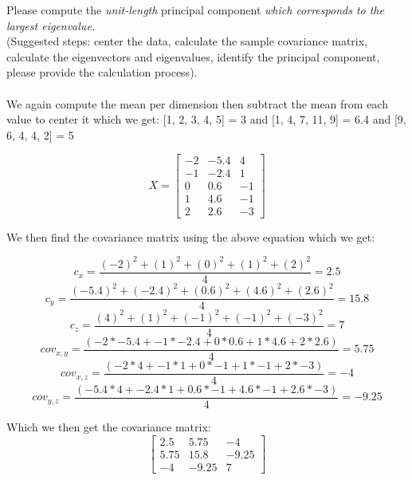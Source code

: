 \documentclass{article}
\begin{document}
\noindent
Please compute the \textit{unit-length} principal component \textit{which corresponds to the largest eigenvalue.}
\\
(Suggested steps: center the data, calculate the sample covariance matrix, calculate the eigenvectors and eigenvalues, identify the principal component, please provide the calculation process).
\\\\
We again compute the mean per dimension then subtract the mean from each value to center it which we get:
[1, 2, 3, 4, 5] = 3 and [1, 4, 7, 11, 9] = 6.4 and [9, 6, 4, 4, 2] = 5

\begin{equation*}
    X = \begin{bmatrix}
        -2  & -5.4  & 4 \\
        -1  & -2.4  & 1 \\
        0   & 0.6   & -1 \\
        1   & 4.6   & -1 \\
        2   & 2.6   & -3
    \end{bmatrix}
\end{equation*}

We then find the covariance matrix using the above equation which we get:

\begin{equation*}
    c_x = \frac{(-2)^2+(1)^2+(0)^2+(1)^2+(2)^2}{4} = 2.5
\end{equation*}
\begin{equation*}
    c_y = \frac{(-5.4)^2+(-2.4)^2+(0.6)^2+(4.6)^2+(2.6)^2}{4} = 15.8
\end{equation*}
\begin{equation*}
    c_z = \frac{(4)^2+(1)^2+(-1)^2+(-1)^2+(-3)^2}{4} = 7
\end{equation*}
\begin{equation*}
    cov_{x,y} = \frac{(-2 * -5.4 + -1 * -2.4 + 0 * 0.6 + 1 * 4.6 + 2 * 2.6)}{4} = 5.75
\end{equation*}
\begin{equation*}
    cov_{x,z} = \frac{(-2 * 4 + -1 * 1 + 0 * -1 + 1 * -1 + 2 * -3)}{4} = -4
\end{equation*}
\begin{equation*}
    cov_{y,z} = \frac{(-5.4 * 4 + -2.4 * 1 + 0.6 * -1 + 4.6 * -1 + 2.6 * -3)}{4} = -9.25
\end{equation*}

Which we then get the covariance matrix:
\begin{equation*}
    \begin{bmatrix}
        2.5 & 5.75 & -4 \\
        5.75 & 15.8 & -9.25 \\
        -4 & -9.25 & 7
    \end{bmatrix}
\end{equation*}
\end{document}
